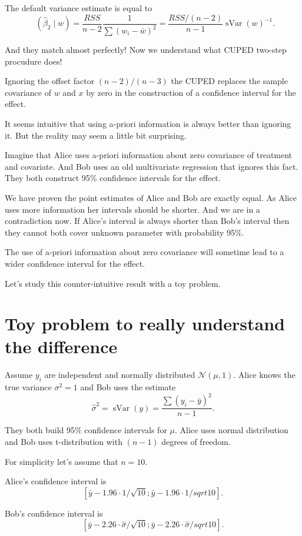 \documentclass[10pt, a4paper]{article}
\DeclareMathOperator{\Var}{Var}
\DeclareMathOperator{\sVar}{sVar}
\DeclareMathOperator{\hVar}{\widehat{\Var}}
\newcommand{\cN}{\mathcal{N}}
\begin{document}
The default variance estimate is equal to
\[
    \hVar(\hat\beta_2 \mid w) = \frac{RSS}{n-2} \frac{1}{\sum (w_i - \bar w)^2} = \frac{RSS/(n-2)}{n-1} \sVar(w)^{-1}.
\]

And they match almost perfectly! Now we understand what CUPED two-step procudure does!

Ignoring the offset factor $(n-2)/(n-3)$ the CUPED replaces the sample 
covariance of $w$ and $x$ by zero in the construction of a confidence interval for the effect. 

It seems intuitive that using a-priori information is always better than ignoring it. 
But the reality may seem a little bit surprising. 

Imagine that Alice uses a-priori information about zero covariance of treatment and covariate. 
And Bob uses an old multivariate regression that ignores this fact. 
They both construct 95\% confidence intervals for the effect. 

We have proven the point estimates of Alice and Bob are exactly equal. 
As Alice uses more information her intervals should be shorter. 
And we are in a contradiction now. 
If Alice's interval is always shorter than Bob's interval then they cannot 
both cover unknown parameter with probability 95\%.

The use of a-priori information about zero covariance will sometime lead to a wider 
confidence interval for the effect. 

Let's study this counter-intuitive result with a toy problem. 

\section{Toy problem to really understand the difference}

Assume $y_i$ are independent and normally distributed $\cN(\mu, 1)$.
Alice knows the true variance $\sigma^2 = 1$ and Bob uses the estimate 
\[
\hat\sigma^2 = \sVar(y) = \frac{\sum(y_i - \bar y)^2}{n-1}.    
\]

They both build 95\% confidence intervals for $\mu$. 
Alice uses normal distribution and Bob uses t-distribution with $(n-1)$ degrees of freedom. 

For simplicity let's assume that $n=10$. 

Alice's confidence interval is 
\[
[\bar y - 1.96 \cdot 1/\sqrt{10}; \bar y - 1.96 \cdot 1/sqrt{10}].
\]

Bob's confidence interval is 
\[
[\bar y - 2.26 \cdot \hat\sigma/\sqrt{10}; \bar y - 2.26 \cdot \hat\sigma/sqrt{10}].        
\]
\end{document}
